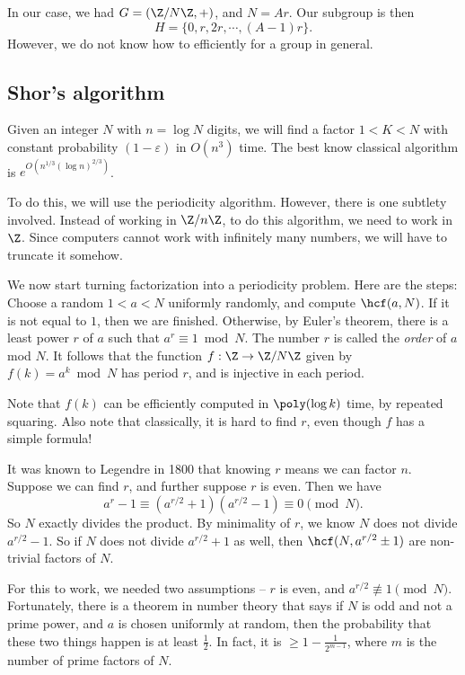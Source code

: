 \documentclass[a4paper]{article}
\begin{document}
In our case, we had $G = (\Z/N\Z, +)$, and $N = Ar$. Our subgroup is then
\[
  H = \{0, r, 2r, \cdots, (A - 1) r\}.
\]
However, we do not know how to efficiently for a group in general.

\subsection{Shor's algorithm}
Given an integer $N$ with $n = \log N$ digits, we will find a factor $1 < K < N$ with constant probability $(1 - \varepsilon)$ in $O(n^3)$ time. The best know classical algorithm is $e^{O(n^{1/3} (\log n)^{2/3})}$.

To do this, we will use the periodicity algorithm. However, there is one subtlety involved. Instead of working in $\Z/n\Z$, to do this algorithm, we need to work in $\Z$. Since computers cannot work with infinitely many numbers, we will have to truncate it somehow.

We now start turning factorization into a periodicity problem. Here are the steps:
Choose a random $1 < a < N$ uniformly randomly, and compute $\hcf(a, N)$. If it is not equal to $1$, then we are finished. Otherwise, by Euler's theorem, there is a least power $r$ of $a$ such that $a^r \equiv 1 \bmod N$. The number $r$ is called the \emph{order} of $a$ mod $N$. It follows that the function $f: \Z \to \Z/N\Z$ given by $f(k) = a^k \bmod N$ has period $r$, and is injective in each period.

Note that $f(k)$ can be efficiently computed in $\poly(\log k)$ time, by repeated squaring. Also note that classically, it is hard to find $r$, even though $f$ has a simple formula!

It was known to Legendre in 1800 that knowing $r$ means we can factor $n$. Suppose we can find $r$, and further suppose $r$ is even. Then we have
\[
  a^r - 1 \equiv (a^{r/2} + 1)(a^{r/2} - 1) \equiv 0 \pmod N.
\]
So $N$ exactly divides the product. By minimality of $r$, we know $N$ does not divide $a^{r/2} - 1$. So if $N$ does not divide $a^{r/2} + 1$ as well, then $\hcf(N, a^{r/2} \pm 1)$ are non-trivial factors of $N$.

For this to work, we needed two assumptions -- $r$ is even, and $a^{r/2} \not\equiv 1 \pmod N$. Fortunately, there is a theorem in number theory that says if $N$ is odd and not a prime power, and $a$ is chosen uniformly at random, then the probability that these two things happen is at least $\frac{1}{2}$. In fact, it is $\geq 1 - \frac{1}{2^{m - 1}}$, where $m$ is the number of prime factors of $N$.
\end{document}
